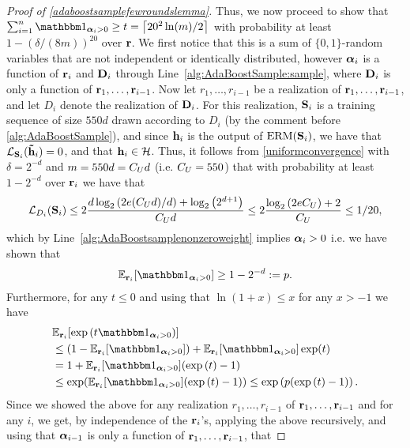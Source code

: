 \begin{proof}[Proof of \cref{adaboostsamplefewroundslemma}]
Thus, we now proceed to show that $\sum_{i=1}^{n} \ind_{\alphar_i>0} \geq t= \left\lceil 20^{2}\ln(m)/2 \right\rceil$ with probability at least $1-(\delta/(8m))^{20}$ over $\mathbf{r}$. We first notice that this is a sum of $\{0,1\}$-random variables that are not independent or identically distributed, however $\bm{\alpha}_i$ is a function of $\mathbf{r}_i$ and $\mathbf{D}_i$ through Line~\ref{alg:AdaBoostSample:sample}, where $\mathbf{D}_i$ is only a function of $\mathbf{r}_1,\ldots,\mathbf{r}_{i-1}$. Now let $r_1,\ldots,r_{i-1}$ be a realization of $\mathbf{r}_1,\ldots,\mathbf{r}_{i-1}$, and let $D_i$ denote the realization of $\mathbf{D}_i$. For this realization, $\mathbf{S}_i$ is a training sequence of size $550d$ drawn according to $D_i$ (by the comment before \cref{alg:AdaBoostSample}), and since $\mathbf{h}_i$ is the output of $\mathrm{ERM}(\mathbf{S}_i)$, we have that $\operatorname{\mathcal{L}}_{\mathbf{S}_i}(\mathbf{\tilde{h}}_i)=0$, and that $\mathbf{h}_{i}\in \mathcal{H}$. Thus, it follows from \cref{uniformconvergence} with $\delta= 2^{-d} $ and $m=550d=C_{U} d$ (i.e. $C_{U}=550$) that with probability at least $1-2^{-d}$ over $\mathbf{r}_{i}$ we have that 
\begin{align*}
    \operatorname{\mathcal{L}}_{D_i}(\mathbf{S}_i)\leq2\frac{d\log_{2}{\left(2e(C_{U} d)/d \right)}+\log_{2}{\left(2^{d+1}  \right)}}{C_{U} d}\leq 2\frac{\log_{2}{\left(2e C_{U} \right)}+2}{C_{U} }\leq 1/20,  
\end{align*}
which by Line~\ref{alg:AdaBoostsamplenonzeroweight} implies $\bm{\alpha}_{i}>0$ i.e. we have shown that 
\begin{align*}
\e_{\rr_{i}}[\ind_{\alphar_i>0}]\geq 1-2^{-d}:=p.                          \end{align*} 
Furthermore, for any $t\leq0 $ and using that $\ln{\left(1+x \right)}\leq x$ for any $x>-1$ we have   
\begin{align*}
&\e_{\rr_{i}}[\exp{\left(t\ind_{\alphar_i>0} \right)}]\\
&\leq (1-\e_{\rr_{i}}[{\ind_{\alphar_i>0}}])+\e_{\rr_{i}}[\ind_{\alphar_i>0}]\exp(t)\\
&=1+\e_{\rr_{i}}[\ind_{\alphar_i>0}](\exp{\left(t \right)}-1)
\\ 
&\leq \exp(\e_{\rr_{i}}[\ind_{\alphar_i>0}](\exp{\left(t \right)}-1))
\leq 
\exp\left(p(\exp{\left(t \right)}-1)\right).  
\end{align*} 
Since we showed the above for any realization $r_1,\ldots,r_{i-1}$ of $\mathbf{r}_1,\ldots,\mathbf{r}_{i-1}$ and for any $i$, we get, by independence of the $\mathbf{r}_{i}$'s, applying the above recursively, and using that $\bm{\alpha}_{i-1}$ is only a function of $\mathbf{r}_{1},\ldots,\mathbf{r}_{i-1}$,  that 
 

\end{proof}
